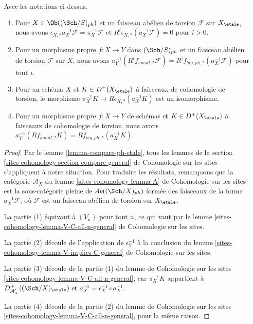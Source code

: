 \begin{lemma}
\label{lemma-V-C-all-n-etale-ph}
Avec les notations ci-dessus.
\begin{enumerate}
\item Pour $X \in \Ob((\Sch/S)_{ph})$ et un faisceau abélien de torsion $\mathcal{F}$
sur $X_\etale$, nous avons
$\epsilon_{X, *}a_X^{-1}\mathcal{F} = \pi_X^{-1}\mathcal{F}$
et $R^i\epsilon_{X, *}(a_X^{-1}\mathcal{F}) = 0$ pour $i > 0$.
\item Pour un morphisme propre $f : X \to Y$ dans $(\Sch/S)_{ph}$
et un faisceau abélien de torsion $\mathcal{F}$ sur $X$, nous avons
$a_Y^{-1}(R^if_{small, *}\mathcal{F}) =
R^if_{big, ph, *}(a_X^{-1}\mathcal{F})$
pour tout $i$.
\item Pour un schéma $X$ et $K \in D^+(X_\etale)$ à faisceaux de
cohomologie de torsion, le morphisme
$\pi_X^{-1}K \to R\epsilon_{X, *}(a_X^{-1}K)$ est un isomorphisme.
\item Pour un morphisme propre $f : X \to Y$ de schémas
et $K \in D^+(X_\etale)$ à faisceaux de cohomologie de torsion, nous avons
$a_Y^{-1}(Rf_{small, *}K) = Rf_{big, ph, *}(a_X^{-1}K)$.
\end{enumerate}
\end{lemma}

\begin{proof}
Par le lemme \ref{lemma-compare-ph-etale}, tous les lemmes de la
section \ref{sites-cohomology-section-compare-general} de Cohomologie sur les sites
s'appliquent à notre situation. Pour traduire les résultats,
remarquons que la catégorie $\mathcal{A}_X$ du
lemme \ref{sites-cohomology-lemma-A} de Cohomologie sur les sites
est la sous-catégorie pleine de $\textit{Ab}((\Sch/X)_{ph})$
formée des faisceaux de la forme $a_X^{-1}\mathcal{F}$,
où $\mathcal{F}$ est un faisceau abélien de torsion sur $X_\etale$.

\medskip\noindent
La partie (1) équivaut à $(V_n)$ pour tout $n$, ce qui vaut par le
lemme \ref{sites-cohomology-lemma-V-C-all-n-general} de Cohomologie sur les sites.

\medskip\noindent
La partie (2) découle de l'application de $\epsilon_Y^{-1}$ à la conclusion du
lemme \ref{sites-cohomology-lemma-V-implies-C-general} de Cohomologie sur les sites.

\medskip\noindent
La partie (3) découle de la partie (1) du lemme de Cohomologie sur les sites
\ref{sites-cohomology-lemma-V-C-all-n-general},
car $\pi_X^{-1}K$ appartient à $D^+_{\mathcal{A}'_X}((\Sch/X)_\etale)$
et $a_X^{-1} = \epsilon_X^{-1} \circ a_X^{-1}$.

\medskip\noindent
La partie (4) découle de la partie (2) du lemme de Cohomologie sur les sites
\ref{sites-cohomology-lemma-V-C-all-n-general},
pour la même raison.
\end{proof}

